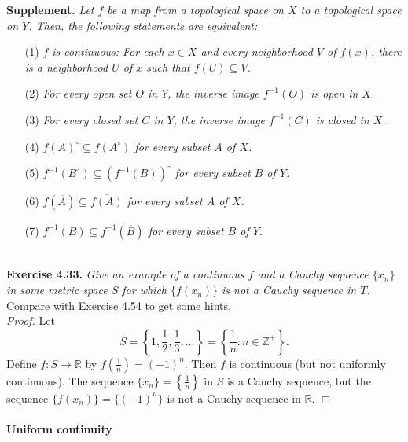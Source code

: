 \documentclass{article}
\begin{document}
\textbf{Supplement.}
\emph{Let $f$ be a map from a topological space on $X$
to a topological space on $Y$.
Then, the following statements are equivalent:}
\begin{enumerate}
\item[(1)]
\emph{$f$ is continuous:
For each $x \in X$ and every neighborhood $V$ of $f(x)$,
there is a neighborhood $U$ of $x$ such that $f(U) \subseteq V$.}
\item[(2)]
\emph{For every open set $O$ in $Y$, the inverse image $f^{-1}(O)$
is open in $X$.}
\item[(3)]
\emph{For every closed set $C$ in $Y$, the inverse image $f^{-1}(C)$
is closed in $X$.}
\item[(4)]
\emph{$f(A)^{\circ} \subseteq f(A^{\circ})$ for every subset $A$ of $X$.}
\item[(5)]
\emph{$f^{-1}(B^{\circ}) \subseteq (f^{-1}(B))^{\circ}$ for every subset $B$ of $Y$.}
\item[(6)]
\emph{$f(\overline{A}) \subseteq \overline{f(A)}$ for every subset $A$ of $X$.}
\item[(7)]
\emph{$\overline{f^{-1}(B)} \subseteq f^{-1}(\overline{B})$ for every subset $B$ of $Y$.} \\\\
\end{enumerate}



\textbf{Exercise 4.33.}
\emph{Give an example of a continuous $f$ and a Cauchy sequence $\{x_n\}$
in some metric space $S$ for which $\{f(x_n)\}$ is not a Cauchy sequence in $T$.} \\

Compare with Exercise 4.54 to get some hints. \\

\emph{Proof.}
Let
$$S
= \left\{ 1, \frac{1}{2}, \frac{1}{3}, ... \right\}
= \left\{ \frac{1}{n} : n \in \mathbb{Z}^+ \right\}.$$
Define $f: S \rightarrow \mathbb{R}$ by $f\left(\frac{1}{n}\right) = (-1)^n$.
Then $f$ is continuous (but not uniformly continuous).
The sequence $\{x_n\} = \left\{ \frac{1}{n} \right\}$ in $S$ is a Cauchy sequence,
but the sequence $\{f(x_n)\} = \{(-1)^n\}$ is not a Cauchy sequence in $\mathbb{R}$.
$\Box$ \\\\



\textbf{\large Uniform continuity} \\\\
\end{document}

